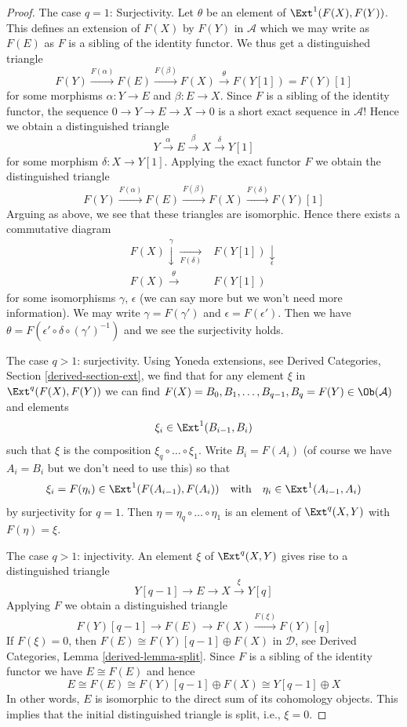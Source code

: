 \begin{proof}
\medskip\noindent
The case $q = 1$: Surjectivity. Let $\theta$ be an element of
$\Ext^1(F(X), F(Y))$. This defines an extension of $F(X)$ by $F(Y)$
in $\mathcal{A}$ which we may write as $F(E)$
as $F$ is a sibling of the identity functor. We thus get a distinguished
triangle
$$
F(Y) \xrightarrow{F(\alpha)} F(E)
\xrightarrow{F(\beta)} F(X)
\xrightarrow{\theta} F(Y[1]) = F(Y)[1]
$$
for some morphisms $\alpha : Y \to E$ and $\beta : E \to X$.
Since $F$ is a sibling of the identity functor, the sequence
$0 \to Y \to E \to X \to 0$
is a short exact sequence in $\mathcal{A}$! Hence we obtain a
distinguished triangle
$$
Y \xrightarrow{\alpha} E \xrightarrow{\beta} X \xrightarrow{\delta} Y[1]
$$
for some morphism $\delta : X \to Y[1]$. Applying the exact functor
$F$ we obtain the distinguished triangle
$$
F(Y) \xrightarrow{F(\alpha)} F(E) \xrightarrow{F(\beta)} F(X)
\xrightarrow{F(\delta)} F(Y)[1]
$$
Arguing as above, we see that these triangles are isomorphic.
Hence there exists a commutative diagram
$$
\begin{array}{cc}F(X) \overset{\gamma}{\downarrow}\underset{F(\delta)}{\longrightarrow} & F(Y[1]) \underset{\epsilon}{\downarrow} \\ F(X) \overset{\theta}{\longrightarrow} & F(Y[1])\end{array}
$$
for some isomorphisms $\gamma$, $\epsilon$ (we can say more but we won't
need more information). We may write $\gamma = F(\gamma')$ and
$\epsilon = F(\epsilon')$. Then we have
$\theta = F(\epsilon' \circ \delta \circ (\gamma')^{-1})$
and we see the surjectivity holds.

\medskip\noindent
The case $q > 1$: surjectivity. Using Yoneda extensions, see
Derived Categories, Section \ref{derived-section-ext}, we find that for any
element $\xi$ in $\Ext^q(F(X), F(Y))$ we can find
$F(X) = B_0, B_1, \ldots, B_{q - 1}, B_q = F(Y) \in \Ob(\mathcal{A})$ and
elements
$$
\xi_i \in \Ext^1(B_{i - 1}, B_i)
$$
such that $\xi$ is the composition $\xi_q \circ \ldots \circ \xi_1$.
Write $B_i = F(A_i)$ (of course we have $A_i = B_i$ but we don't
need to use this) so that
$$
\xi_i = F(\eta_i) \in \Ext^1(F(A_{i - 1}), F(A_i))
\quad\text{with}\quad
\eta_i \in \Ext^1(A_{i - 1}, A_i)
$$
by surjectivity for $q = 1$. Then $\eta = \eta_q \circ \ldots \circ \eta_1$
is an element of $\Ext^q(X, Y)$ with $F(\eta) = \xi$.

\medskip\noindent
The case $q > 1$: injectivity. An element $\xi$ of $\Ext^q(X, Y)$
gives rise to a distinguished triangle
$$
Y[q - 1] \to E \to X \xrightarrow{\xi} Y[q]
$$
Applying $F$ we obtain a distinguished triangle
$$
F(Y)[q - 1] \to F(E) \to F(X) \xrightarrow{F(\xi)} F(Y)[q]
$$
If $F(\xi) = 0$, then $F(E) \cong F(Y)[q - 1] \oplus F(X)$
in $\mathcal{D}$, see
Derived Categories, Lemma \ref{derived-lemma-split}.
Since $F$ is a sibling of the identity functor we have
$E \cong F(E)$ and hence
$$
E \cong F(E) \cong F(Y)[q - 1] \oplus F(X) \cong Y[q - 1] \oplus X
$$
In other words, $E$ is isomorphic to the
direct sum of its cohomology objects. This implies that the
initial distinguished triangle is split, i.e., $\xi = 0$.
\end{proof}

